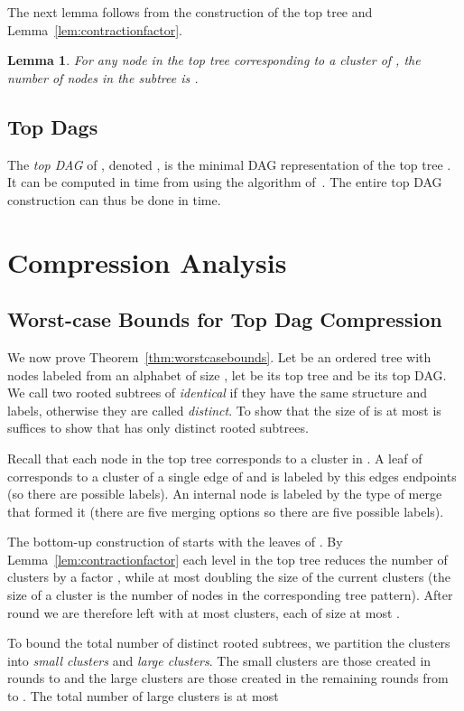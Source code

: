 \documentclass [11pt]{article}
\newtheorem{lemma}{Lemma}
\begin{document}
The next lemma follows from the construction of the top tree and Lemma~\ref{lem:contractionfactor}.
\begin{lemma}\label{lem:subtresize}
For any node  in the top tree corresponding to a cluster  of , the number of nodes in the subtree  is .
\end{lemma}


\subsection{Top Dags}
The \emph{top DAG} of , denoted , is the minimal DAG representation of the top tree .  It can be computed in  time from  using the algorithm of~\cite{DST1980}.
The entire  top DAG construction can thus be done in  time.





\section{Compression Analysis}


\subsection{Worst-case Bounds for Top Dag Compression}
We now prove Theorem~\ref{thm:worstcasebounds}. 
Let  be an ordered tree with  nodes labeled from an alphabet of size , let  be its top tree and  be its top DAG. We call two rooted subtrees of  {\em identical} if they have the same structure and labels, otherwise they are called {\em distinct}.  
To show that  the size of  is at most 
 is suffices to show that  has only  distinct rooted subtrees.

Recall that each node in the top tree  corresponds to a cluster in . A leaf of  corresponds to a cluster of a single edge of  and is labeled by this edges endpoints (so there are  possible labels). An internal node is labeled by the type of merge that formed it (there are five merging options so there are five possible labels). 

The bottom-up construction of   starts with the leaves of . By Lemma~\ref{lem:contractionfactor} each level in the top tree reduces the number of clusters by a factor , while at most doubling the size of the current clusters (the  size of a cluster is the number of nodes in the corresponding tree pattern). After round  we are therefore left with at most  clusters, each of size at most . 

To bound the total number of distinct rooted subtrees, we partition the clusters into \emph{small clusters} and \emph{large clusters}. 
The small clusters are those created in rounds  to  and the large clusters are those created in the remaining rounds from  to .  The total number of large clusters is at most 
 
\end{document}
